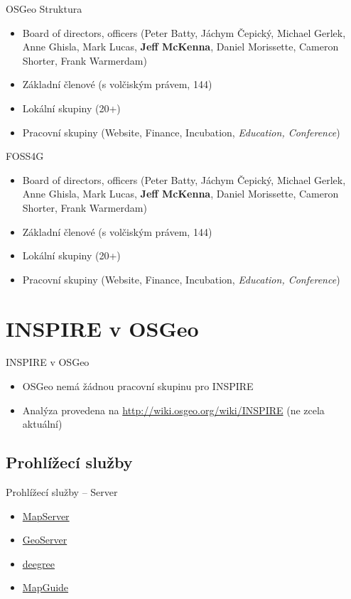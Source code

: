 \documentclass{beamer}
\begin{document}
\begin{frame}{OSGeo Struktura}
\begin{itemize}
    \item Board of directors, officers
        (Peter Batty, Jáchym Čepický, Michael Gerlek, Anne Ghisla, Mark Lucas,
        {\bf Jeff McKenna}, Daniel Morissette, Cameron Shorter, Frank Warmerdam)
            \pause
    \item Základní členové (s volčiským právem, 144)
            \pause
    \item Lokální skupiny  (20+)
            \pause
    \item Pracovní skupiny (Website, Finance, Incubation, {\em Education, Conference})
\end{itemize}
\end{frame}

\begin{frame}{FOSS4G}
\begin{itemize}
    \item Board of directors, officers
        (Peter Batty, Jáchym Čepický, Michael Gerlek, Anne Ghisla, Mark Lucas,
        {\bf Jeff McKenna}, Daniel Morissette, Cameron Shorter, Frank Warmerdam)
            \pause
    \item Základní členové (s volčiským právem, 144)
            \pause
    \item Lokální skupiny  (20+)
            \pause
    \item Pracovní skupiny (Website, Finance, Incubation, {\em Education, Conference})
\end{itemize}
\end{frame}

\section{INSPIRE v OSGeo}

\begin{frame}{INSPIRE v OSGeo}
    \begin{itemize}
        \item OSGeo nemá žádnou pracovní skupinu pro INSPIRE
        \item Analýza provedena na \url{http://wiki.osgeo.org/wiki/INSPIRE} (ne
        zcela aktuální)
    \end{itemize}
\end{frame}

\subsection{Prohlížecí služby}
\begin{frame}{Prohlížecí služby -- Server}
    \begin{itemize}
        \item \href{http://mapserver.org}{MapServer}
        \item \href{http://geoserver.org}{GeoServer}
        \item \href{http://deegree.org}{deegree}
        \item \href{http://mapguide.osgeo.org}{MapGuide}
    \end{itemize}
\end{frame}
\end{document}
